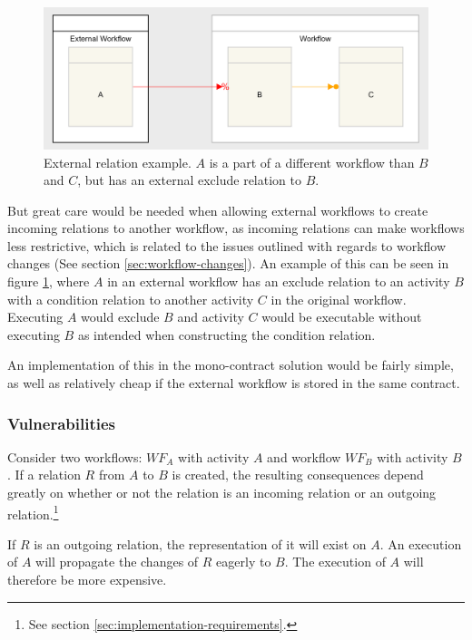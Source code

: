 \documentclass{article}
\begin{document}
		\begin{figure}[!ht]
			\centering
			\includegraphics[scale=0.3]{figures/external-relations-example.png}
		 	\caption[External relation example]
		 	{External relation example. $A$ is a part of a different workflow than $B$ and $C$, but has an external exclude relation to $B$.}
		 	\label{fig:external-relations-example}
		\end{figure}


		But great care would be needed when allowing external workflows to create incoming relations to another workflow, as incoming relations can make workflows less restrictive, which is related to the issues outlined with regards to workflow changes (See section \ref{sec:workflow-changes}). 
		An example of this can be seen in figure \ref{fig:external-relations-example}, where $A$ in an external workflow has an exclude relation to an activity $B$ with a condition relation to another activity $C$ in the original workflow. 
		Executing $A$ would exclude $B$ and activity $C$ would be executable without executing $B$ as intended when constructing the condition relation.

		An implementation of this in the mono-contract solution would be fairly simple, as well as relatively cheap if the external workflow is stored in the same contract.

			\subsubsection{Vulnerabilities}
			Consider two workflows: $WF_{A}$ with activity $A$ and workflow $WF_{B}$ with activity $B$.
			If a relation $R$ from $A$ to $B$ is created, the resulting consequences depend greatly on whether or not the relation is an incoming relation or an outgoing relation.\footnote{See section \ref{sec:implementation-requirements}.}

			If $R$ is an outgoing relation, the representation of it will exist on $A$. 
			An execution of $A$ will propagate the changes of $R$ eagerly to $B$. 
			The execution of $A$ will therefore be more expensive.
\end{document}
